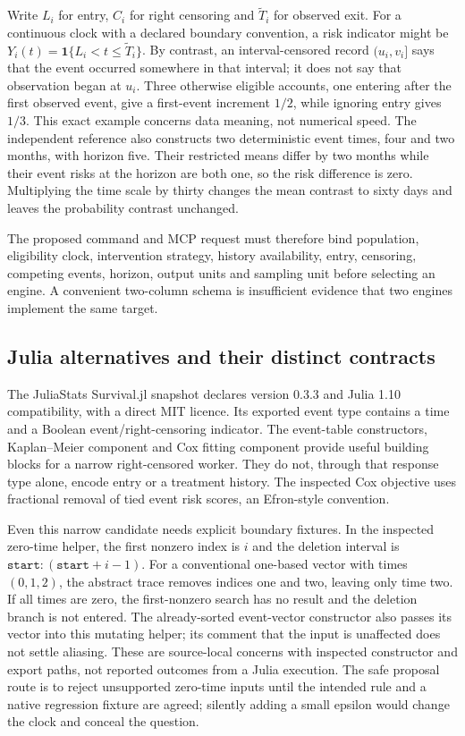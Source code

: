 Write $L_i$ for entry, $C_i$ for right censoring and $\widetilde T_i$ for observed exit.
For a continuous clock with a declared boundary convention, a risk indicator might be
$Y_i(t)=\mathbf1\{L_i<t\leq\widetilde T_i\}$. By contrast, an interval-censored
record $(u_i,v_i]$ says that the event occurred somewhere in that interval; it does not
say that observation began at $u_i$. Three otherwise eligible accounts, one entering
after the first observed event, give a first-event increment $1/2$, while ignoring
entry gives $1/3$. This exact example concerns data meaning, not numerical speed.
The independent reference also constructs two deterministic event times, four and
two months, with horizon five. Their restricted means differ by two months while
their event risks at the horizon are both one, so the risk difference is zero.
Multiplying the time scale by thirty changes the mean contrast to sixty days and
leaves the probability contrast unchanged.~\citep{exec24_survivalother_reference}

The proposed command and MCP request must therefore bind population, eligibility
clock, intervention strategy, history availability, entry, censoring, competing events,
horizon, output units and sampling unit before selecting an engine. A convenient
two-column schema is insufficient evidence that two engines implement the same target.

\subsection{Julia alternatives and their distinct contracts}
The JuliaStats Survival.jl snapshot declares version 0.3.3 and Julia 1.10 compatibility,
with a direct MIT licence. Its exported event type contains a time and a Boolean
event/right-censoring indicator. The event-table constructors, Kaplan--Meier component
and Cox fitting component provide useful building blocks for a narrow right-censored
worker. They do not, through that response type alone, encode entry or a treatment
history. The inspected Cox objective uses fractional removal of tied event risk
scores, an Efron-style convention.~\citep{exec24_survivalother_juliastats}

Even this narrow candidate needs explicit boundary fixtures. In the inspected
zero-time helper, the first nonzero index is $i$ and the deletion interval is
$\texttt{start}:(\texttt{start}+i-1)$. For a conventional one-based vector
with times $(0,1,2)$, the abstract trace removes indices one and two, leaving only
time two. If all times are zero, the first-nonzero search has no result and the
deletion branch is not entered. The already-sorted event-vector constructor also
passes its vector into this mutating helper; its comment that the input is unaffected
does not settle aliasing. These are source-local concerns with inspected constructor
and export paths, not reported outcomes from a Julia execution. The safe proposal
route is to reject unsupported zero-time inputs until the intended rule and a native
regression fixture are agreed; silently adding a small epsilon would change the
clock and conceal the question.~\citep{exec24_survivalother_juliastats,exec24_survivalother_reference}

